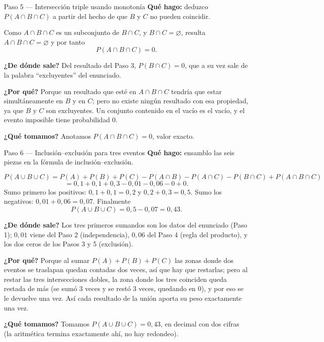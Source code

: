 \documentclass[11pt]{article}
\begin{document}
\begin{paso}{Paso 5 --- Intersección triple usando monotonía}
\textbf{Qué hago:} deduzco $P(A\cap B\cap C)$ a partir del hecho de que $B$ y $C$ no pueden coincidir.

Como $A\cap B\cap C$ es un subconjunto de $B\cap C$, y $B\cap C=\varnothing$, resulta $A\cap B\cap C=\varnothing$ y por tanto
\[
P(A\cap B\cap C)=0.
\]

\textbf{¿De dónde sale?} Del resultado del Paso 3, $P(B\cap C)=0$, que a su vez sale de la palabra ``excluyentes'' del enunciado.

\textbf{¿Por qué?} Porque un resultado que esté en $A\cap B\cap C$ tendría que estar simultáneamente en $B$ y en $C$; pero no existe ningún resultado con esa propiedad, ya que $B$ y $C$ son excluyentes. Un conjunto contenido en el vacío es el vacío, y el evento imposible tiene probabilidad $0$.

\textbf{¿Qué tomamos?} Anotamos $P(A\cap B\cap C)=0$, valor exacto.
\end{paso}

\begin{paso}{Paso 6 --- Inclusión--exclusión para tres eventos}
\textbf{Qué hago:} ensamblo las seis piezas en la fórmula de inclusión--exclusión.

\[
P(A\cup B\cup C)=P(A)+P(B)+P(C)-P(A\cap B)-P(A\cap C)-P(B\cap C)+P(A\cap B\cap C)
\]
\[
=0{,}1+0{,}1+0{,}3-0{,}01-0{,}06-0+0.
\]
Sumo primero los positivos: $0{,}1+0{,}1=0{,}2$ y $0{,}2+0{,}3=0{,}5$. Sumo los negativos: $0{,}01+0{,}06=0{,}07$. Finalmente
\[
P(A\cup B\cup C)=0{,}5-0{,}07=0{,}43.
\]

\textbf{¿De dónde sale?} Los tres primeros sumandos son los datos del enunciado (Paso 1); $0{,}01$ viene del Paso 2 (independencia), $0{,}06$ del Paso 4 (regla del producto), y los dos ceros de los Pasos 3 y 5 (exclusión).

\textbf{¿Por qué?} Porque al sumar $P(A)+P(B)+P(C)$ las zonas donde dos eventos se traslapan quedan contadas dos veces, así que hay que restarlas; pero al restar las tres intersecciones dobles, la zona donde los tres coinciden queda restada de más (se sumó $3$ veces y se restó $3$ veces, quedando en $0$), y por eso se le devuelve una vez. Así cada resultado de la unión aporta su peso exactamente una vez.

\textbf{¿Qué tomamos?} Tomamos $P(A\cup B\cup C)=0{,}43$, en decimal con dos cifras (la aritmética termina exactamente ahí, no hay redondeo).
\end{paso}
\end{document}
